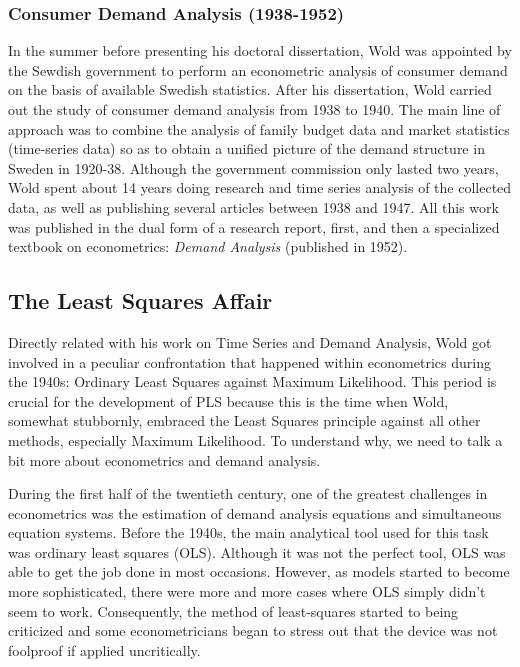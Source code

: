 \documentclass[12pt]{book}\usepackage{graphicx, color}
\begin{document}
\subsubsection*{Consumer Demand Analysis (1938-1952)}
In the summer before presenting his doctoral dissertation, Wold was appointed by the Sewdish government to perform an econometric analysis of consumer demand on the basis of available Swedish statistics. After his dissertation, Wold carried out the study of consumer demand analysis from 1938 to 1940. The main line of approach was to combine the analysis of family budget data and market statistics (time-series data) so as to obtain a unified picture of the demand structure in Sweden in 1920-38. Although the government commission only lasted two years, Wold spent about 14 years doing research and time series analysis of the collected data, as well as publishing several articles between 1938 and 1947. All this work was published in the dual form of a research report, first, and then a specialized textbook on econometrics: \textit{Demand Analysis} (published in 1952).



\subsection{The Least Squares Affair}
Directly related with his work on Time Series and Demand Analysis, Wold got involved in a peculiar confrontation that happened within econometrics during the 1940s: Ordinary Least Squares against Maximum Likelihood. This period is crucial for the development of PLS because this is the time when Wold, somewhat stubbornly, embraced the Least Squares principle against all other methods, especially Maximum Likelihood. To understand why, we need to talk a bit more about econometrics and demand analysis.

During the first half of the twentieth century, one of the greatest challenges in econometrics was the estimation of demand analysis equations and simultaneous equation systems. Before the 1940s, the main analytical tool used for this task was ordinary least squares (OLS). Although it was not the perfect tool, OLS was able to get the job done in most occasions. However, as models started to become more sophisticated, there were more and more cases where OLS simply didn't seem to work. Consequently, the method of least-squares started to being criticized and some econometricians began to stress out that the device was not foolproof if applied uncritically. 
\end{document}
